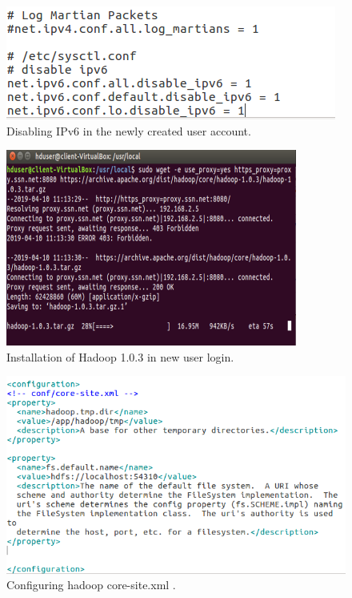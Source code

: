\documentclass[a4paper,10pt]{article}
\begin{document}
\begin{figure}[h]
	\includegraphics[scale=0.34,center]{exptTwoScreenShot/fig5Two.png}
	\caption{Disabling IPv6 in the newly created user account.}
	\label{fig:5.2}
\end{figure}

\begin{figure}[h]
	\includegraphics[scale=0.45,center]{exptTwoScreenShot/fig6.png}
	\caption{Installation of Hadoop 1.0.3 in new user login.}
	\label{fig:6}
\end{figure}
\newpage
\begin{figure}[h]
	\includegraphics[scale=0.30,center]{exptTwoScreenShot/fig7.png}
	\caption{Configuring hadoop core-site.xml .}
	\label{fig:7}
\end{figure}
\end{document}
